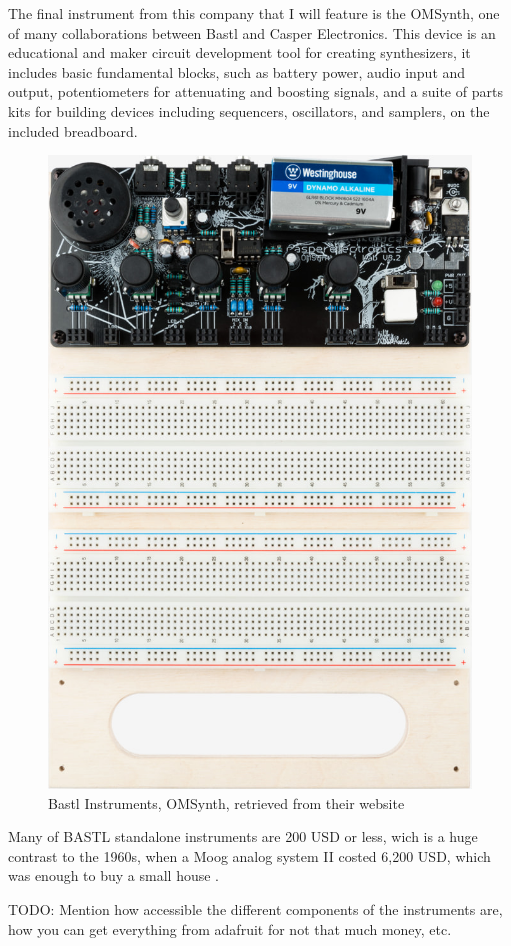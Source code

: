 The final instrument from this company that I will feature is the OMSynth, one of many collaborations between Bastl and Casper Electronics. This device is an educational and maker circuit development tool for creating synthesizers, it includes basic fundamental blocks, such as battery power, audio input and output, potentiometers for attenuating and boosting signals, and a suite of parts kits for building devices including sequencers, oscillators, and samplers, on the included breadboard.

\begin{figure}[h]
  \centering
  \includegraphics[width=0.75\linewidth,height=0.25\textheight,keepaspectratio]{images/bastl-omsynth.jpg}
  \caption{Bastl Instruments, OMSynth, retrieved from their website}
  \label{fig:bastl-omsynth}
\end{figure}

Many of BASTL standalone instruments are 200 USD or less, wich is a huge contrast to the 1960s, when a Moog analog system II costed 6,200 USD, which was enough to buy a small house \cite{analog-days}.

TODO: Mention how accessible the different components of the instruments are, how you can get everything from adafruit for not that much money, etc.

